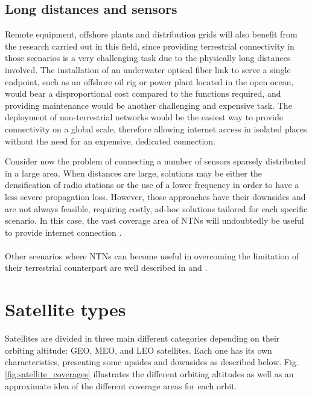 \subsection{Long distances and sensors}
Remote equipment, offshore plants and distribution grids will also benefit from the research carried out in this field, since providing terrestrial connectivity in those scenarios is a very challenging task due to the physically long distances involved. The installation of an underwater optical fiber link to serve a single endpoint, such as an offshore oil rig or power plant located in the open ocean, would bear a disproportional cost compared to the functions required, and providing maintenance would be another challenging and expensive task. 
The deployment of non-terrestrial networks would be the easiest way to provide connectivity on a global scale, therefore allowing internet access in isolated places without the need for an expensive, dedicated connection.

Consider now the problem of connecting a number of sensors sparsely distributed in a large area. When distances are large, solutions may be either the densification of radio stations or the use of a lower frequency in order to have a less severe propagation loss. However, those approaches have their downsides and are not always feasible, requiring costly, ad-hoc solutions tailored for each specific scenario. In this case, the vast coverage area of \ac{NTNs} will undoubtedly be useful to provide internet connection \cite{performance-ntn-support-iot-wang}.

\paragraph{} Other scenarios where \ac{NTNs} can become useful in overcoming the limitation of their terrestrial counterpart are well described in \cite{ntn-6g-era-challenges-giordani} and \cite{potential-multilayered-nierarchical-ntn-wang}.

\section{Satellite types}
\label{sec:satellite-types}
Satellites are divided in three main different categories depending on their orbiting altitude: \ac{GEO}, \ac{MEO}, and \ac{LEO} satellites. Each one has its own characteristics, presenting some upsides and downsides as described below. Fig. \ref{fig:satellite_coverages} illustrates the different orbiting altitudes as well as an approximate idea of the different coverage areas for each orbit.


